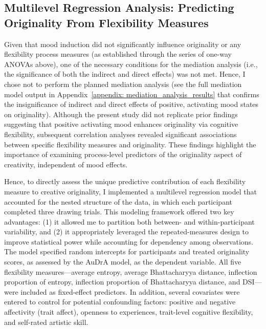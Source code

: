 \documentclass[../MA_Thesis.tex]{subfiles}
\begin{document}
\subsection*{Multilevel Regression Analysis: Predicting Originality From Flexibility Measures}
Given that mood induction did not significantly influence originality or any flexibility process measures (as established through the series of one-way ANOVAs above), one of the necessary conditions for the mediation analysis (i.e., the significance of both the indirect and direct effects) was not met. Hence, I chose not to perform the planned mediation analysis (see the full mediation model output in Appendix~\ref{appendix: mediation_analysis_results} that confirms the insignificance of indirect and direct effects of positive, activating mood states on originality). Although the present study did not replicate prior findings suggesting that positive activating mood enhances originality via cognitive flexibility, subsequent correlation analyses revealed significant associations between specific flexibility measures and originality. These findings highlight the importance of examining process-level predictors of the originality aspect of creativity, independent of mood effects.

Hence, to directly assess the unique predictive contribution of each flexibility measure to creative originality, I implemented a multilevel regression model that accounted for the nested structure of the data, in which each participant completed three drawing trials. This modeling framework offered two key advantages: (1) it allowed me to partition both between- and within-participant variability, and (2) it appropriately leveraged the repeated-measures design to improve statistical power while accounting for dependency among observations. The model specified random intercepts for participants and treated originality scores, as assessed by the AuDrA model, as the dependent variable. All five flexibility measures—average entropy, average Bhattacharyya distance, inflection proportion of entropy, inflection proportion of Bhattacharyya distance, and DSI—were included as fixed-effect predictors. In addition, several covariates were entered to control for potential confounding factors: positive and negative affectivity (trait affect), openness to experiences, trait-level cognitive flexibility, and self-rated artistic skill.
\end{document}

